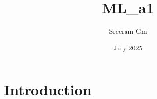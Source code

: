 \documentclass{article}
\title{ML_a1}
\author{Sreeram Gm}
\date{July 2025}
\begin{document}
\maketitle

\section{Introduction}
\end{document}
